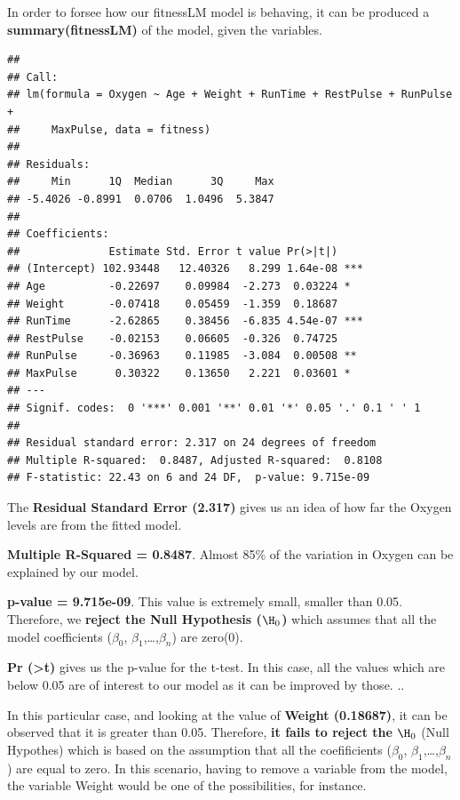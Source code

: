 \documentclass[]{article}
\begin{document}
In order to forsee how our fitnessLM model is behaving, it can be
produced a \textbf{summary(fitnessLM)} of the model, given the
variables.

\begin{verbatim}
## 
## Call:
## lm(formula = Oxygen ~ Age + Weight + RunTime + RestPulse + RunPulse + 
##     MaxPulse, data = fitness)
## 
## Residuals:
##     Min      1Q  Median      3Q     Max 
## -5.4026 -0.8991  0.0706  1.0496  5.3847 
## 
## Coefficients:
##              Estimate Std. Error t value Pr(>|t|)    
## (Intercept) 102.93448   12.40326   8.299 1.64e-08 ***
## Age          -0.22697    0.09984  -2.273  0.03224 *  
## Weight       -0.07418    0.05459  -1.359  0.18687    
## RunTime      -2.62865    0.38456  -6.835 4.54e-07 ***
## RestPulse    -0.02153    0.06605  -0.326  0.74725    
## RunPulse     -0.36963    0.11985  -3.084  0.00508 ** 
## MaxPulse      0.30322    0.13650   2.221  0.03601 *  
## ---
## Signif. codes:  0 '***' 0.001 '**' 0.01 '*' 0.05 '.' 0.1 ' ' 1
## 
## Residual standard error: 2.317 on 24 degrees of freedom
## Multiple R-squared:  0.8487, Adjusted R-squared:  0.8108 
## F-statistic: 22.43 on 6 and 24 DF,  p-value: 9.715e-09
\end{verbatim}

The \textbf{Residual Standard Error (2.317)} gives us an idea of how far
the Oxygen levels are from the fitted model.

\textbf{Multiple R-Squared = 0.8487}. Almost 85\% of the variation in
Oxygen can be explained by our model.

\textbf{p-value = 9.715e-09}. This value is extremely small, smaller
than 0.05. Therefore, we \textbf{reject the Null Hypothesis (\(\H_0\))}
which assumes that all the model coefficients (\(\beta_0\),
\(\beta_1\),\ldots{},\(\beta_n\)) are zero(0).

\textbf{Pr (\textgreater{}\textbar{}t\textbar{})} gives us the p-value
for the t-test. In this case, all the values which are below 0.05 are of
interest to our model as it can be improved by those. ..

In this particular case, and looking at the value of \textbf{Weight
(0.18687)}, it can be observed that it is greater than 0.05. Therefore,
\textbf{it fails to reject the \(\H_0\)} (Null Hypothes) which is based
on the assumption that all the coefificients (\(\beta_0\),
\(\beta_1\),\ldots{},\(\beta_n\)) are equal to zero. In this scenario,
having to remove a variable from the model, the variable Weight would be
one of the possibilities, for instance.
\end{document}
